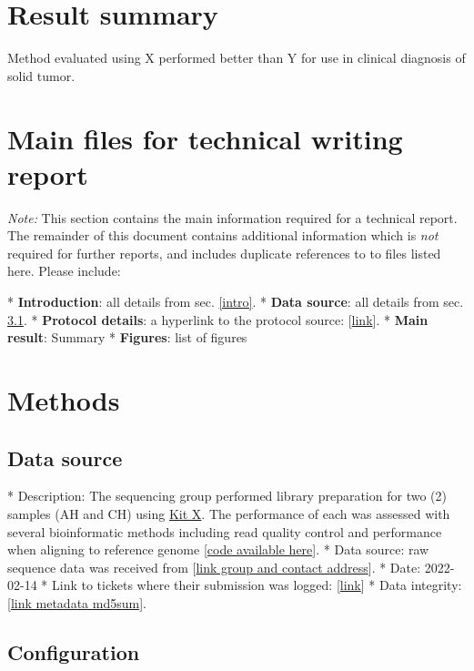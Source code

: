 \documentclass{article}
\begin{document}
\section{Result summary}
Method evaluated using X performed better than Y for use in clinical diagnosis of solid tumor.
\begin{markdown}

\section{Main files for technical writing report}
\textit{Note:}
This section contains the main information required for a technical report.
The remainder of this document contains additional information which is \textit{not} required for further reports, and includes duplicate references to to files listed here.
Please include:

* \textbf{Introduction}: all details from sec. \ref{intro}.
* \textbf{Data source}: all details from sec. \ref{data_source}.
* \textbf{Protocol details}: a hyperlink to the protocol source: [\href{https://github.com/DylanLawless/kit_assess/README.md}{link}].
* \textbf{Main result}: Summary 
* \textbf{Figures}: list of figures




\section{Methods}
\subsection{Data source}
 \label{data_source}

* Description: The sequencing group performed library preparation for two (2) samples (AH and CH) using \href{https://www.sophiagenetics.com/clinical/oncology/solid-tumors/}{Kit X}.
The performance of each was assessed with several bioinformatic methods including read quality control and performance when aligning to reference genome
[\href{https://github.com/DylanLawless/kit_assess}{code available here}].
* Data source: raw sequence data was received from
 [\href{https://www.sophiagenetics.com}{link group and contact address}].
* Date: 2022-02-14
* Link to tickets where their submission was logged: [\href{https://www.sophiagenetics.com}{link}]
* Data integrity: [\href{https://github.com/DylanLawless/kit_assess/src/metadata/raw.md5sum}{link metadata md5sum}].



\subsection{Configuration}


\end{markdown}
\end{document}
